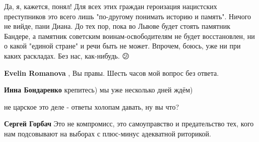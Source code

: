 \begin{itemize}
\begin{itemize}
 

Да, я, кажется, понял! Для всех этих граждан героизация нацистских преступников
это всего лишь "по-другому понимать историю и память". Ничого не вийде, пани
Диана. До тех пор, пока во Львове будет стоять памятник Бандере, а памятник
советским воинам-освободителям не будет восстановлен, ни о какой "единой
стране" и речи быть не может. Впрочем, боюсь, уже ни при каких раскладах. Без
нас, как-нибудь. 😕


 
\textbf{Evelin Romanova} , Вы правы. Шесть часов мой вопрос без ответа.

 
\textbf{Инна Бондаренко} крепитесь) мы уже несколько дней ждём)

 
не царское это деле - ответы холопам давать, ну вы что?

 
\textbf{Сергей Горбач} Это не компромисс, это самоуправство и предательство тех, кого нам подсовывают на выборах с плюс-минус адекватной риторикой.

 

\end{itemize}
\end{itemize}
